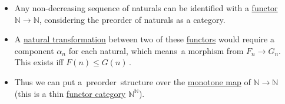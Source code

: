 \begin{itemize}
    \item  Any non-decreasing sequence of naturals can be identified with a \hyperref[D3.35]{functor} $\mathbb{N}\rightarrow \mathbb{N}$, considering the preorder of naturals as a category.
    \item A \hyperref[D3.49]{natural transformation} between two of these \hyperref[D3.35]{functors} would require a component $\alpha_n$ for each natural, which means \,a morphism from $F_n \rightarrow G_n$. This exists iff $F(n)\leq G(n)$\,.
    \item Thus we can put a \,preorder\, structure over the \hyperref[D1.59]{monotone map} of $\mathbb{N} \rightarrow \mathbb{N}$ (this is a thin \hyperref[D3.54]{functor category} $\mathbb{N}^\mathbb{N}$).
  \end{itemize}
